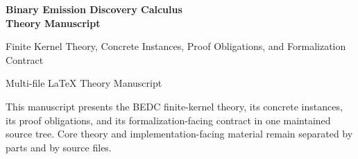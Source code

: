 \begin{titlepage}
\centering
{\Huge\bfseries Binary Emission Discovery Calculus\\[4pt]Theory Manuscript}\par
\vspace{0.4cm}
{\Large Finite Kernel Theory, Concrete Instances, Proof Obligations, and Formalization Contract}\par
\vspace{0.8cm}
{\large Multi-file LaTeX Theory Manuscript}\par
\vfill
\begin{minipage}{0.86\textwidth}
\small
This manuscript presents the BEDC finite-kernel theory, its concrete instances, its proof obligations, and its formalization-facing contract in one maintained source tree. Core theory and implementation-facing material remain separated by parts and by source files.
\end{minipage}
\end{titlepage}
